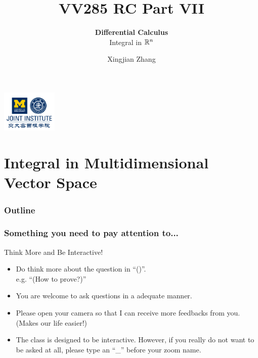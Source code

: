 \documentclass[12pt, t]{beamer}
\title{VV285 RC Part VII}
\subtitle{\textbf{Differential Calculus}\\\large Integral in $\mathbb{R}^n$}
\institute[UM-SJTU JI]{Univerity of Michigan-Shanghai Jiao Tong University Joint Institute}
\author{Xingjian Zhang}
\begin{document}
\begin{frame}
    \titlepage
    \begin{center}
        \includegraphics[height=2cm]{logo2.png}
    \end{center}
\end{frame}

\section{Integral in Multidimensional Vector Space}
\begin{frame}
    \frametitle{Outline}
    \begin{spacing}{1.2}
        \tableofcontents[currentsubsection,hideothersubsections,sectionstyle=hide]
    \end{spacing}
\end{frame}

\begin{frame}
    \frametitle{Something you need to pay attention to...}
    Think More and Be Interactive!
    \begin{itemize}
        \item Do think more about the question in ``()''. \\e.g. ``(How to prove?)''
        \item You are welcome to ask questions in a adequate manner.
        \item Please open your camera so that I can receive more feedbacks from you. (Makes our life easier!)
        \item The class is designed to be interactive. However, if you really do not want to be asked at all, please type an ``\_'' before your zoom name.
    \end{itemize}
\end{frame}
\end{document}
